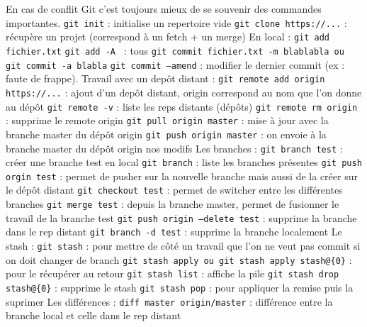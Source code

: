 \documentclass{article}
\begin{document}
    En cas de conflit Git c'est toujours mieux de se souvenir des commandes importantes. \bigbreak
    \noindent\texttt{git init} : initialise un repertoire vide \smallbreak
    \noindent\texttt{git clone https://...} : récupère un projet (correspond à un fetch + un merge) \bigbreak
    \noindent En local : \bigbreak
    \noindent\texttt{git add fichier.txt} \smallbreak
    \noindent\texttt{git add -A } : tous \smallbreak
    \noindent\texttt{git commit fichier.txt -m blablabla ou git commit -a blabla} \smallbreak
    \noindent\texttt{git commit --amend} : modifier le dernier commit (ex : faute de frappe). \bigbreak
    \noindent Travail avec un depôt distant : \bigbreak
    \noindent\texttt{git remote add origin https://...} : ajout d'un depôt distant, origin correspond au nom que l'on donne au dépôt \smallbreak
    \noindent\texttt{git remote -v} : liste les reps distants (dépôts) \smallbreak
    \noindent\texttt{git remote rm origin} : supprime le remote origin \smallbreak
    \noindent\texttt{git pull origin master} : mise à jour avec la branche master du dépôt origin \smallbreak
    \noindent\texttt{git push origin master} : on envoie à la branche master du dépôt origin nos modifs \bigbreak
    \noindent Les branches : \bigbreak
    \noindent\texttt{git branch test} : créer une branche test en local \smallbreak
    \noindent\texttt{git branch} : liste les branches présentes \smallbreak
    \noindent\texttt{git push orgin test} : permet de pusher sur la nouvelle branche mais aussi de la créer sur le dépôt distant \smallbreak
    \noindent\texttt{git checkout test} : permet de switcher entre les différentes branches \smallbreak
    \noindent\texttt{git merge test} : depuis la branche master, permet de fusionner le travail de la branche test \smallbreak
    \noindent\texttt{git push origin --delete test} : supprime la branche dans le rep distant \smallbreak
    \noindent\texttt{git branch -d test} : supprime la branche localement \bigbreak
    \noindent Le stash : \bigbreak
    \noindent\texttt{git stash} : pour mettre de côté un travail que l'on ne veut pas commit si on doit changer de branch \smallbreak
    \noindent\texttt{git stash apply ou git stash apply stash@\{0\}} : pour le récupérer au retour \smallbreak
    \noindent\texttt{git stash list} : affiche la pile \smallbreak
    \noindent\texttt{git stash drop stash@\{0\}} : supprime le stash \smallbreak
    \noindent\texttt{git stash pop} : pour appliquer la remise puis la suprimer \bigbreak
    \noindent Les différences : \bigbreak
    \noindent\texttt{diff master origin/master} : différence entre la branche local et celle dans le rep distant \bigbreak
\end{document}
